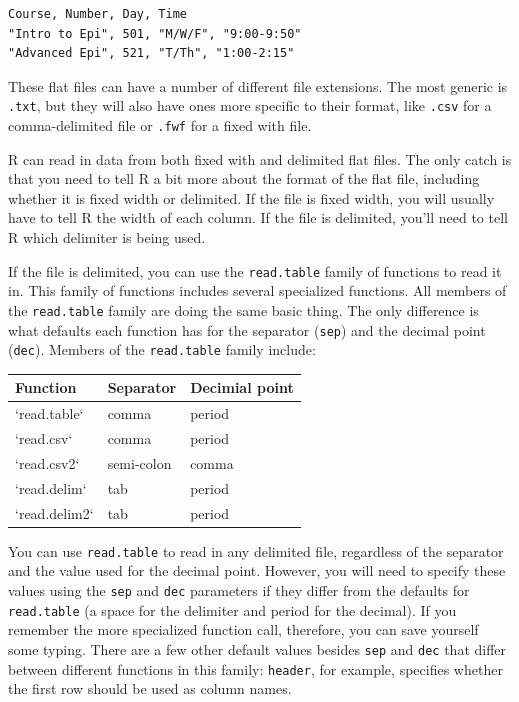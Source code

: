 \documentclass[]{book}
\theoremstyle{definition}
\theoremstyle{definition}
\theoremstyle{definition}
\theoremstyle{remark}
\begin{document}
\begin{verbatim}
Course, Number, Day, Time
"Intro to Epi", 501, "M/W/F", "9:00-9:50"
"Advanced Epi", 521, "T/Th", "1:00-2:15"
\end{verbatim}

These flat files can have a number of different file extensions. The
most generic is \texttt{.txt}, but they will also have ones more
specific to their format, like \texttt{.csv} for a comma-delimited file
or \texttt{.fwf} for a fixed with file.

R can read in data from both fixed with and delimited flat files. The
only catch is that you need to tell R a bit more about the format of the
flat file, including whether it is fixed width or delimited. If the file
is fixed width, you will usually have to tell R the width of each
column. If the file is delimited, you'll need to tell R which delimiter
is being used.

If the file is delimited, you can use the \texttt{read.table} family of
functions to read it in. This family of functions includes several
specialized functions. All members of the \texttt{read.table} family are
doing the same basic thing. The only difference is what defaults each
function has for the separator (\texttt{sep}) and the decimal point
(\texttt{dec}). Members of the \texttt{read.table} family include:

\begin{tabular}{l|l|l}
\hline
Function & Separator & Decimial point\\
\hline
`read.table` & comma & period\\
\hline
`read.csv` & comma & period\\
\hline
`read.csv2` & semi-colon & comma\\
\hline
`read.delim` & tab & period\\
\hline
`read.delim2` & tab & period\\
\hline
\end{tabular}

You can use \texttt{read.table} to read in any delimited file,
regardless of the separator and the value used for the decimal point.
However, you will need to specify these values using the \texttt{sep}
and \texttt{dec} parameters if they differ from the defaults for
\texttt{read.table} (a space for the delimiter and period for the
decimal). If you remember the more specialized function call, therefore,
you can save yourself some typing. There are a few other default values
besides \texttt{sep} and \texttt{dec} that differ between different
functions in this family: \texttt{header}, for example, specifies
whether the first row should be used as column names.
\end{document}
